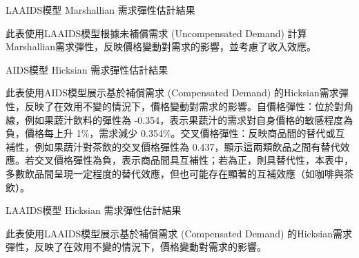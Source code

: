\begin{table}[H]
    \caption{LAAIDS模型 Marshallian 需求彈性估計結果}
    \center
    \footnotesize
      \label{laaids_marshall}
\end{table}
\vspace{-2em}
\begin{singlespace}
    \begin{footnotesize}
        \raggedright
         此表使用LAAIDS模型根據未補償需求 (Uncompensated Demand) 計算Marshallian需求彈性，反映價格變動對需求的影響，並考慮了收入效應。
    \end{footnotesize}
\end{singlespace}

\begin{table}[H]
    \caption{AIDS模型 Hicksian 需求彈性估計結果} \label{aids_hicks}
    \center
    \footnotesize
    
\end{table}
\vspace{-2em}
\begin{singlespace}
    \begin{footnotesize}
        \raggedright
         此表使用AIDS模型展示基於補償需求 (Compensated Demand) 的Hicksian需求彈性，反映了在效用不變的情況下，價格變動對需求的影響。自價格彈性：位於對角線，例如果蔬汁飲料的彈性為 -0.354，表示果蔬汁的需求對自身價格的敏感程度為負，價格每上升 1\%，需求減少 0.354\%。交叉價格彈性：反映商品間的替代或互補性，例如果蔬汁對茶飲的交叉價格彈性為 0.437，顯示這兩類飲品之間有替代效應。若交叉價格彈性為負，表示商品間具互補性；若為正，則具替代性，本表中，多數飲品間呈現一定程度的替代效應，但也可能存在顯著的互補效應（如咖啡與茶飲）。
    \end{footnotesize}
\end{singlespace}

\begin{table}[H]
    \caption{LAAIDS模型 Hicksian 需求彈性估計結果} \label{laaids_hicks}
    \center
    \footnotesize
    
\end{table}
\vspace{-2em}
\begin{singlespace}
    \begin{footnotesize}
        \raggedright
         此表使用LAAIDS模型展示基於補償需求 (Compensated Demand) 的Hicksian需求彈性，反映了在效用不變的情況下，價格變動對需求的影響。
    \end{footnotesize}
\end{singlespace}


